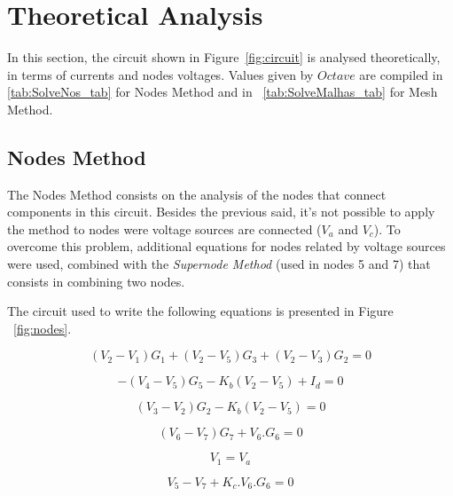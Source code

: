 \section{Theoretical Analysis}
\label{sec:analysis}

In this section, the circuit shown in Figure~\ref{fig:circuit} is analysed
theoretically, in terms of currents and nodes voltages. Values given by $Octave$ are compiled in \ref{tab:SolveNos_tab} for Nodes Method and in ~\ref{tab:SolveMalhas_tab} for Mesh Method.

\subsection{Nodes Method}


The Nodes Method consists on the analysis of the nodes that connect components in this circuit. Besides the previous said, it's not possible to apply the method to nodes were voltage sources are connected ($V_a$ and $V_c$). To overcome this problem, additional equations for nodes related by voltage sources were used, combined with the \textit{Supernode Method} (used in nodes 5 and 7) that consists in combining two nodes. 

The circuit used to write the following equations is presented in Figure ~\ref{fig:nodes}.



\begin{equation}
  (V_2 - V_1) G_1 + (V_2- V_5) G_3 + (V_2 - V_3) G_2 = 0
  \label{eq_1}
\end{equation}

\begin{equation}
  -(V_4 -V_5) G_5 - K_b (V_2 - V_5) + I_d = 0
  \label{eq_2}
\end{equation}

\begin{equation}
  (V_3 -V_2) G_2 - K_b (V_2 - V_5) = 0
  \label{eq_3}
\end{equation}

\begin{equation}
  (V_6 -V_7) G_7 + V_6 . G_6 = 0
  \label{eq_4}
\end{equation}

\begin{equation}
  V_1 = V_a
  \label{eq_5}
\end{equation}

\begin{equation}
  V_5 - V_7 + K_c . V_6 . G_6 = 0
  \label{eq_6}
\end{equation}

